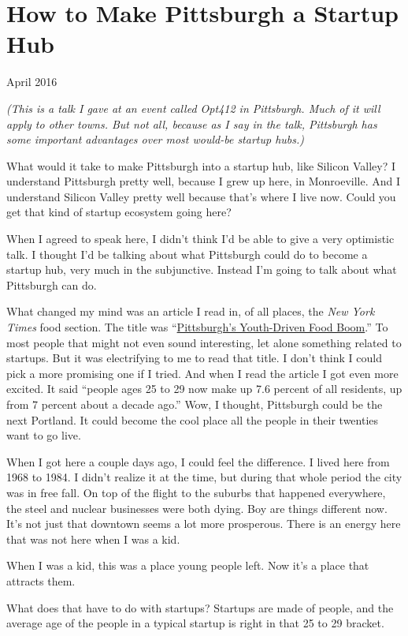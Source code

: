 \chapter{How to Make Pittsburgh a Startup Hub}

April 2016

\emph{(This is a talk I gave at an event called Opt412 in Pittsburgh.
Much of it will apply to other towns. But not all, because as I say in
the talk, Pittsburgh has some important advantages over most would-be
startup hubs.)}

What would it take to make Pittsburgh into a startup hub, like Silicon
Valley? I understand Pittsburgh pretty well, because I grew up here, in
Monroeville. And I understand Silicon Valley pretty well because that's
where I live now. Could you get that kind of startup ecosystem going
here?

When I agreed to speak here, I didn't think I'd be able to give a very
optimistic talk. I thought I'd be talking about what Pittsburgh could do
to become a startup hub, very much in the subjunctive. Instead I'm going
to talk about what Pittsburgh can do.

What changed my mind was an article I read in, of all places, the
\emph{New York Times} food section. The title was
``\href{http://www.nytimes.com/2016/03/16/dining/pittsburgh-restaurants.html}{Pittsburgh's
Youth-Driven Food Boom}.'' To most people that might not even sound
interesting, let alone something related to startups. But it was
electrifying to me to read that title. I don't think I could pick a more
promising one if I tried. And when I read the article I got even more
excited. It said ``people ages 25 to 29 now make up 7.6 percent of all
residents, up from 7 percent about a decade ago.'' Wow, I thought,
Pittsburgh could be the next Portland. It could become the cool place
all the people in their twenties want to go live.

When I got here a couple days ago, I could feel the difference. I lived
here from 1968 to 1984. I didn't realize it at the time, but during that
whole period the city was in free fall. On top of the flight to the
suburbs that happened everywhere, the steel and nuclear businesses were
both dying. Boy are things different now. It's not just that downtown
seems a lot more prosperous. There is an energy here that was not here
when I was a kid.

When I was a kid, this was a place young people left. Now it's a place
that attracts them.

What does that have to do with startups? Startups are made of people,
and the average age of the people in a typical startup is right in that
25 to 29 bracket.

